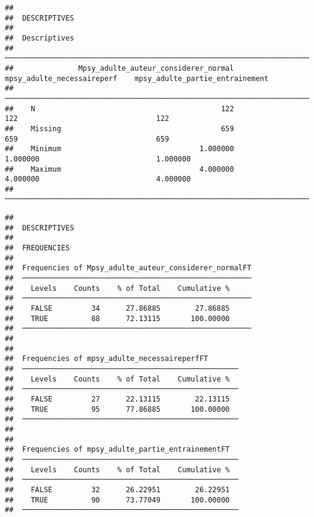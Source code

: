 \documentclass[
]{article}
\begin{document}
\begin{verbatim}
## 
##  DESCRIPTIVES
## 
##  Descriptives                                                                                                         
##  ──────────────────────────────────────────────────────────────────────────────────────────────────────────────────── 
##               Mpsy_adulte_auteur_considerer_normal    mpsy_adulte_necessaireperf    mpsy_adulte_partie_entrainement   
##  ──────────────────────────────────────────────────────────────────────────────────────────────────────────────────── 
##    N                                           122                           122                                122   
##    Missing                                     659                           659                                659   
##    Minimum                                1.000000                      1.000000                           1.000000   
##    Maximum                                4.000000                      4.000000                           4.000000   
##  ────────────────────────────────────────────────────────────────────────────────────────────────────────────────────
\end{verbatim}

\begin{verbatim}
## 
##  DESCRIPTIVES
## 
##  FREQUENCIES
## 
##  Frequencies of Mpsy_adulte_auteur_considerer_normalFT 
##  ───────────────────────────────────────────────────── 
##    Levels    Counts    % of Total    Cumulative %   
##  ───────────────────────────────────────────────────── 
##    FALSE         34      27.86885        27.86885   
##    TRUE          88      72.13115       100.00000   
##  ───────────────────────────────────────────────────── 
## 
## 
##  Frequencies of mpsy_adulte_necessaireperfFT        
##  ────────────────────────────────────────────────── 
##    Levels    Counts    % of Total    Cumulative %   
##  ────────────────────────────────────────────────── 
##    FALSE         27      22.13115        22.13115   
##    TRUE          95      77.86885       100.00000   
##  ────────────────────────────────────────────────── 
## 
## 
##  Frequencies of mpsy_adulte_partie_entrainementFT   
##  ────────────────────────────────────────────────── 
##    Levels    Counts    % of Total    Cumulative %   
##  ────────────────────────────────────────────────── 
##    FALSE         32      26.22951        26.22951   
##    TRUE          90      73.77049       100.00000   
##  ──────────────────────────────────────────────────
\end{verbatim}
\end{document}
